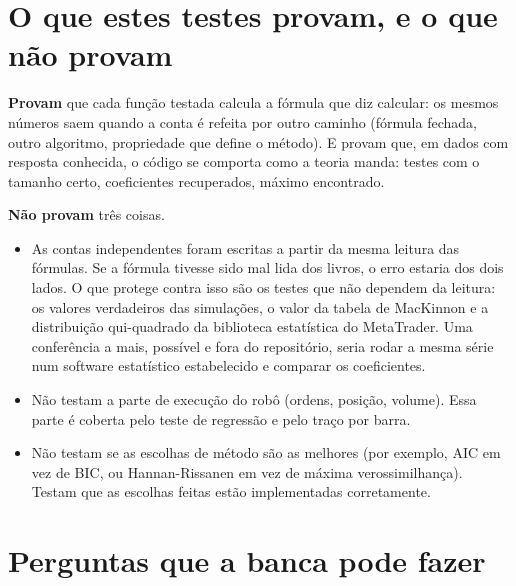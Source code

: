\documentclass[11pt,a4paper]{article}
\begin{document}
\section{O que estes testes provam, e o que não provam}

\textbf{Provam} que cada função testada calcula a fórmula que diz calcular: os mesmos números saem quando a conta é
refeita por outro caminho (fórmula fechada, outro algoritmo, propriedade que define o método). E provam que, em
dados com resposta conhecida, o código se comporta como a teoria manda: testes com o tamanho certo, coeficientes
recuperados, máximo encontrado.

\textbf{Não provam} três coisas.
\begin{itemize}[leftmargin=1.2em]
\item As contas independentes foram escritas a partir da mesma leitura das fórmulas. Se a fórmula tivesse sido
mal lida dos livros, o erro estaria dos dois lados. O que protege contra isso são os testes que não dependem da
leitura: os valores verdadeiros das simulações, o valor da tabela de MacKinnon e a distribuição qui-quadrado da
biblioteca estatística do MetaTrader. Uma conferência a mais, possível e fora do repositório, seria rodar a mesma
série num software estatístico estabelecido e comparar os coeficientes.
\item Não testam a parte de execução do robô (ordens, posição, volume). Essa parte é coberta pelo teste de
regressão e pelo traço por barra.
\item Não testam se as escolhas de método são as melhores (por exemplo, AIC em vez de BIC, ou Hannan-Rissanen em
vez de máxima verossimilhança). Testam que as escolhas feitas estão implementadas corretamente.
\end{itemize}

\section{Perguntas que a banca pode fazer}
\end{document}

